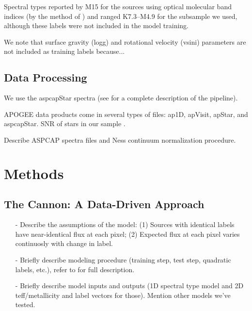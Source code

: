\documentclass[modern]{aastex62}
\begin{document}
Spectral types reported by M15 for the sources using optical molecular band indices (by the method of \citealt{Lepine:2013}) and ranged K7.3--M4.9 for the subsample we used, although these labels were not included in the model training.

We note that surface gravity (logg) and rotational velocity (vsini) parameters are not included as training labels because...


\subsection{Data Processing}

We use the aspcapStar spectra (see \citealt{Perez:2016} for a complete description of the pipeline).

APOGEE data products come in several types of files: ap1D, apVisit, apStar, and aspcapStar. SNR of stars in our sample .

Describe ASPCAP spectra files and Ness continuum normalization procedure.


\section{Methods} \label{sec:cannon}

\subsection{The Cannon: A Data-Driven Approach}

\begin{enumerate}
\item[-] Describe the assumptions of the model: (1) Sources with identical labels have near-identical flux at each pixel; (2) Expected flux at each pixel varies continuosly with change in label. 
\item[-] Briefly describe modeling procedure (training step, test step, quadratic labels, etc.), refer to \citealt{Ness:2015} for full description.
\item[-] Briefly describe model inputs and outputs (1D spectral type model and 2D teff/metallicity and label vectors for those). Mention other models we've tested.
\end{enumerate}
\end{document}
